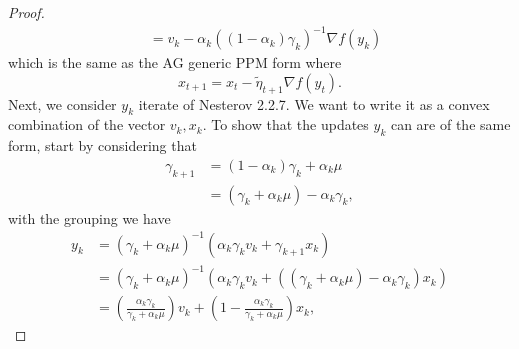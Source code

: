 \documentclass[12pt]{article}
\begin{document}
\begin{proof}
\begin{align*}
                    &= 
                    v_k - \alpha_k((1 - \alpha_k)\gamma_k)^{-1}\nabla f(y_k)
                \end{align*}
                which is the same as the AG generic PPM form where 
                $$
                    x_{t + 1} = x_t - \tilde \eta_{t + 1}\nabla f(y_t). 
                $$
                Next, we consider $y_{k}$ iterate of Nesterov 2.2.7. 
                We want to write it as a convex combination of the vector $v_k,x_k$. 
                To show that the updates $y_k$ can are of the same form, start by considering that 
                \begin{align*}
                    \gamma_{k + 1 } &= (1 - \alpha_k)\gamma_k + \alpha_k \mu
                    \\
                    &= (\gamma_k + \alpha_k \mu) - \alpha_k \gamma_k, 
                \end{align*}
                with the grouping we have
                \begin{align*}
                    y_k &= \left(
                        \gamma_k + \alpha_k \mu
                        \right)^{-1} \left(
                            \alpha_k \gamma_k v_k + \gamma_{k + 1}x_k
                        \right)
                    \\
                    &= 
                    \left(
                        \gamma_k + \alpha_k \mu
                    \right)^{-1}
                    \left(
                        \alpha_k \gamma_k v_k 
                        + 
                        ((\gamma_k + \alpha_k\mu) - \alpha_k\gamma_k)x_k
                    \right)
                    \\
                    &= 
                    \left(
                        \frac{\alpha_k \gamma_k}{\gamma_k + \alpha_k \mu}
                    \right)v_k
                    + 
                    \left(
                        1 - \frac{\alpha_k\gamma_k }{\gamma_k + \alpha_k \mu}
                    \right)x_k, 
                \end{align*}


\end{proof}
\end{document}
